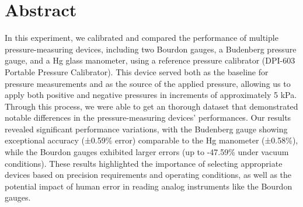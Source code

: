 \documentclass{article}
\newcounter{dataset}
\begin{document}
	\section{Abstract}
	In this experiment, we calibrated and compared the performance of multiple pressure-measuring devices, including two Bourdon gauges, a Budenberg pressure gauge, and a Hg glass manometer, using a reference pressure calibrator (DPI-603 Portable Pressure Calibrator). This device served both as the baseline for pressure measurements and as the source of the applied pressure, allowing us to apply both positive and negative pressures in increments of approximately 5 kPa. Through this process, we were able to get an thorough dataset that demonstrated notable differences in the pressure-measuring devices' performances. Our results revealed significant performance variations, with the Budenberg gauge showing exceptional accuracy (±0.59\% error) comparable to the Hg manometer (±0.58\%), while the Bourdon gauges exhibited larger errors (up to -47.59\% under vacuum conditions). These results highlighted the importance of selecting appropriate devices based on precision requirements and operating conditions, as well as the potential impact of human error in reading analog instruments like the Bourdon gauges.

	
	\newpage\vspace*{-20pt}
\end{document}
